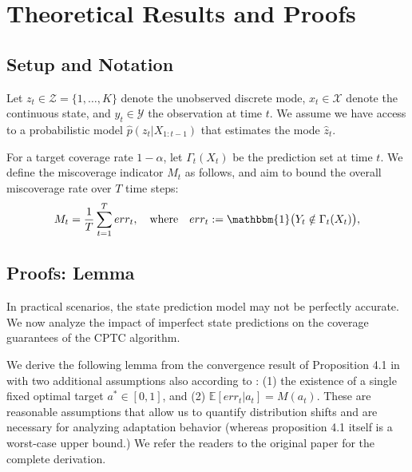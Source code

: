 \clearpage
\onecolumn

\section{Theoretical Results and Proofs}
\label{app:proofs}

\subsection{Setup and Notation}

Let \( z_t \in \mathcal{Z} = \{1, \dots, K\} \) denote the unobserved discrete mode,  \( x_t \in \mathcal{X} \) denote the continuous state, and \( y_t \in \mathcal{Y} \) the observation at time $t$. We assume we have access to a probabilistic model \( \hat{p}(z_t | X_{1:t-1}) \) that estimates the mode $\hat{z}_t$.

For a target coverage rate \( 1 - \alpha \), let \( \Gamma_{t}(X_t) \) be the prediction set at time \( t \). We define the miscoverage indicator \( M_t \) as follows, and aim to bound the overall miscoverage rate over \( T \) time steps:
\[
M_t = \frac{1}{T} \sum_{t=1}^T err_t, \quad \text{where} \quad err_t := \mathbbm{1}\big(Y_t \notin \Gamma_{t}(X_t)\big),
\]



\subsection{Proofs: Lemma}

In practical scenarios, the state prediction model may not be perfectly accurate. We now analyze the impact of imperfect state predictions on the coverage guarantees of the CPTC algorithm.
 
We derive the following lemma from the convergence result of Proposition 4.1 in \cite{gibbs2021adaptive} with two additional assumptions also according to \cite{gibbs2021adaptive}: (1) the existence of a single fixed optimal target $a^* \in [0,1]$, and (2) $\mathbb{E} [err_t | a_t] = M(a_t)$. These are reasonable assumptions that allow us to quantify distribution shifts and are necessary for analyzing adaptation behavior  (whereas proposition 4.1 itself is a worst-case upper bound.) We refer the readers to the original paper for the complete derivation. 


